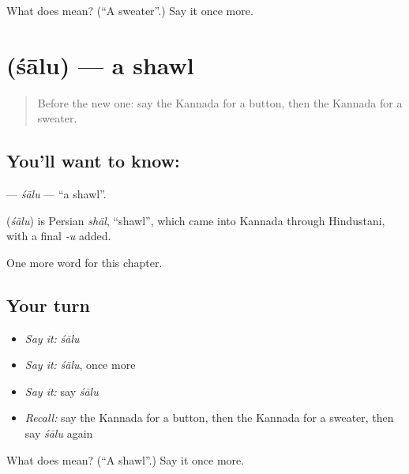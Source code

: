 \begin{tcolorbox}[breakable,colback=teal!4,colframe=teal!35!black,title={Before you move on}]
What does  mean? (\textquotedblleft{}A sweater\textquotedblright{}.) Say it once more.
\end{tcolorbox}
\section[\texorpdfstring{\kn{ಶಾಲು} (śālu)}{ಶಾಲು (śālu)}]{ (śālu) — a shawl}

\label{lesson:KA-C259-salu2}



\begin{quote}
Before the new one: say the Kannada for a button, then the Kannada for a sweater.
\end{quote}

\subsection*{You'll want to know: }
\textbf{} — \emph{śālu} — \textquotedblleft{}a shawl\textquotedblright{}.

\begin{cousinweb}
\textbf{} (\emph{śālu}) is Persian \emph{shāl}, \textquotedblleft{}shawl\textquotedblright{}, which came into Kannada through Hindustani, with a final \emph{-u} added.
\end{cousinweb}

\begin{grammarlens}[title={What you've built}]
One more word for this chapter.
\end{grammarlens}

\subsection*{Your turn}
\begin{itemize}
\raggedright
  \item \emph{Say it:} \emph{śālu}
  \item \emph{Say it:} \emph{śālu}, once more
  \item \emph{Say it:} say \emph{śālu}
  \item \emph{Recall:} say the Kannada for a button, then the Kannada for a sweater, then say \emph{śālu} again
\end{itemize}

\begin{tcolorbox}[breakable,colback=teal!4,colframe=teal!35!black,title={Before you move on}]
What does  mean? (\textquotedblleft{}A shawl\textquotedblright{}.) Say it once more.
\end{tcolorbox}
